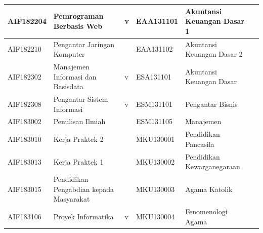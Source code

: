 \begin{enumerate}
\begin{table}[H]
\begin{tabular}{|p{2cm}|p{3.5cm}|p{1.75cm}|p{2cm}|p{3.5cm}|p{1.75cm}|}
AIF182204 & Pemrograman Berbasis Web & v & EAA131101 & Akuntansi Keuangan Dasar 1 &  \\ \hline
AIF182210 & Pengantar Jaringan Komputer & & EAA131102 & Akuntansi Keuangan Dasar 2 & \\ \hline
AIF182302 & Manajemen Informasi dan Basisdata & v & ESA131101 & Akuntansi Keuangan Dasar &  \\ \hline
AIF182308 & Pengantar Sistem Informasi & v & ESM131101 & Pengantar Bisnis &  \\ \hline
AIF183002 & Penulisan Ilmiah & & ESM131105 & Manajemen & \\ \hline
AIF183010 & Kerja Praktek 2 & & MKU130001 & Pendidikan Pancasila & \\ \hline
AIF183013 & Kerja Praktek 1 & & MKU130002 & Pendidikan Kewarganegaraan & \\ \hline
AIF183015 & Pendidikan Pengabdian kepada Masyarakat & & MKU130003 & Agama Katolik & \\ \hline
AIF183106 & Proyek Informatika & v & MKU130004 & Fenomenologi Agama &  \\ \hline
\end{tabular}
\end{table}


\end{enumerate}

